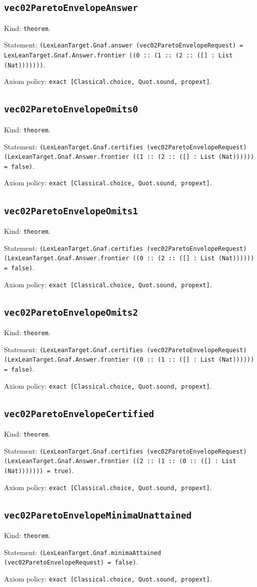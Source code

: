 \documentclass[11pt]{article}
\begin{document}
\subsection*{\texttt{vec02ParetoEnvelopeAnswer}}
\noindent Kind: \texttt{theorem}.\par
\noindent Statement: \texttt{(LexLeanTarget.Gnaf.answer (vec02ParetoEnvelopeRequest) = LexLeanTarget.Gnaf.Answer.frontier ((0 :: (1 :: (2 :: ([] : List (Nat)))))))}.\par
\noindent Axiom policy: \texttt{exact [Classical.choice, Quot.sound, propext]}.\par
\subsection*{\texttt{vec02ParetoEnvelopeOmits0}}
\noindent Kind: \texttt{theorem}.\par
\noindent Statement: \texttt{(LexLeanTarget.Gnaf.certifies (vec02ParetoEnvelopeRequest) (LexLeanTarget.Gnaf.Answer.frontier ((1 :: (2 :: ([] : List (Nat)))))) = false)}.\par
\noindent Axiom policy: \texttt{exact [Classical.choice, Quot.sound, propext]}.\par
\subsection*{\texttt{vec02ParetoEnvelopeOmits1}}
\noindent Kind: \texttt{theorem}.\par
\noindent Statement: \texttt{(LexLeanTarget.Gnaf.certifies (vec02ParetoEnvelopeRequest) (LexLeanTarget.Gnaf.Answer.frontier ((0 :: (2 :: ([] : List (Nat)))))) = false)}.\par
\noindent Axiom policy: \texttt{exact [Classical.choice, Quot.sound, propext]}.\par
\subsection*{\texttt{vec02ParetoEnvelopeOmits2}}
\noindent Kind: \texttt{theorem}.\par
\noindent Statement: \texttt{(LexLeanTarget.Gnaf.certifies (vec02ParetoEnvelopeRequest) (LexLeanTarget.Gnaf.Answer.frontier ((0 :: (1 :: ([] : List (Nat)))))) = false)}.\par
\noindent Axiom policy: \texttt{exact [Classical.choice, Quot.sound, propext]}.\par
\subsection*{\texttt{vec02ParetoEnvelopeCertified}}
\noindent Kind: \texttt{theorem}.\par
\noindent Statement: \texttt{(LexLeanTarget.Gnaf.certifies (vec02ParetoEnvelopeRequest) (LexLeanTarget.Gnaf.Answer.frontier ((2 :: (1 :: (0 :: ([] : List (Nat))))))) = true)}.\par
\noindent Axiom policy: \texttt{exact [Classical.choice, Quot.sound, propext]}.\par
\subsection*{\texttt{vec02ParetoEnvelopeMinimaUnattained}}
\noindent Kind: \texttt{theorem}.\par
\noindent Statement: \texttt{(LexLeanTarget.Gnaf.minimaAttained (vec02ParetoEnvelopeRequest) = false)}.\par
\noindent Axiom policy: \texttt{exact [Classical.choice, Quot.sound, propext]}.\par
\end{document}
